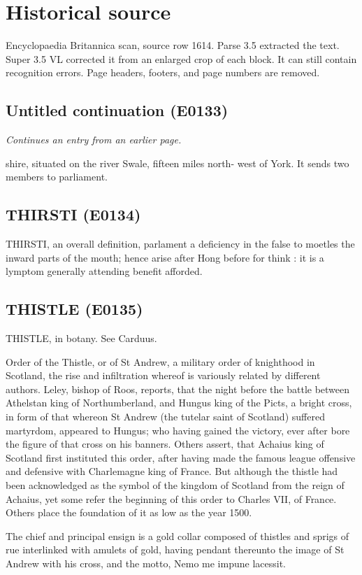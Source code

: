 \documentclass{article}
\begin{document}
\section*{Historical source}
Encyclopaedia Britannica scan, source row 1614. Parse 3.5 extracted the text. Super 3.5 VL corrected it from an enlarged crop of each block. It can still contain recognition errors.
Page headers, footers, and page numbers are removed.

\subsection*{Untitled continuation (E0133)}
\textit{Continues an entry from an earlier page.}

shire, situated on the river Swale, fifteen miles north-
west of York. It sends two members to parliament.

\subsection*{THIRSTI (E0134)}
THIRSTI, an overall definition, parlament a deficiency in the false to moetles the inward parts of the mouth; hence arise after Hong before for think : it is a lymptom generally attending benefit afforded.

\subsection*{THISTLE (E0135)}
THISTLE, in botany. See Carduus.

Order of the Thistle, or of St Andrew, a military order of knighthood in Scotland, the rise and infiltration whereof is variously related by different authors. Leley, bishop of Roos, reports, that the night before the battle between Athelstan king of Northumberland, and Hungus king of the Picts, a bright cross, in form of that whereon St Andrew (the tutelar saint of Scotland) suffered martyrdom, appeared to Hungus; who having gained the victory, ever after bore the figure of that cross on his banners. Others assert, that Achaius king of Scotland first instituted this order, after having made the famous league offensive and defensive with Charlemagne king of France. But although the thistle had been acknowledged as the symbol of the kingdom of Scotland from the reign of Achaius, yet some refer the beginning of this order to Charles VII, of France. Others place the foundation of it as low as the year 1500.

The chief and principal ensign is a gold collar composed of thistles and sprigs of rue interlinked with amulets of gold, having pendant thereunto the image of St Andrew with his cross, and the motto, Nemo me impune lacessit.
\end{document}
